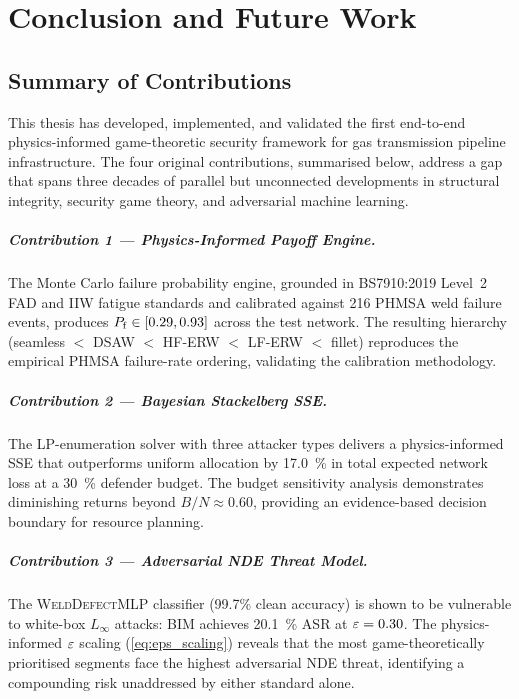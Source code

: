 
\chapter{Conclusion and Future Work}
\label{ch:conclusion}

\section{Summary of Contributions}
\label{sec:conclusion_summary}

This thesis has developed, implemented, and validated the first
end-to-end physics-informed game-theoretic security framework for
gas transmission pipeline infrastructure.  The four original
contributions, summarised below, address a gap that spans three
decades of parallel but unconnected developments in structural
integrity, security game theory, and adversarial machine learning.

\paragraph{Contribution 1 — Physics-Informed Payoff Engine.}
The Monte Carlo failure probability engine, grounded in
\ac{BS7910}:2019 Level~2 \ac{FAD} and \ac{IIW} fatigue standards and
calibrated against 216 \ac{PHMSA} weld failure events, produces
$P_{\mathrm{f}} \in [0.29, 0.93]$ across the test network.  The
resulting hierarchy (seamless $< $ DSAW $<$ HF-ERW $<$ LF-ERW $<$
fillet) reproduces the empirical PHMSA failure-rate ordering, validating
the calibration methodology.

\paragraph{Contribution 2 — Bayesian Stackelberg SSE.}
The LP-enumeration solver with three attacker types delivers a
physics-informed \ac{SSE} that outperforms uniform allocation by
\SI{17.0}{\percent} in total expected network loss at a
\SI{30}{\percent} defender budget.  The budget sensitivity analysis
demonstrates diminishing returns beyond $B/N \approx \num{0.60}$,
providing an evidence-based decision boundary for resource planning.

\paragraph{Contribution 3 — Adversarial NDE Threat Model.}
The \textsc{WeldDefectMLP} classifier (99.7\% clean accuracy) is shown
to be vulnerable to white-box $L_\infty$ attacks: \ac{BIM} achieves
\SI{20.1}{\percent} \acs{ASR} at $\varepsilon = 0.30$.  The
physics-informed $\varepsilon$ scaling (\cref{eq:eps_scaling}) reveals that
the most game-theoretically prioritised segments face the highest
adversarial NDE threat, identifying a compounding risk unaddressed
by either standard alone.

